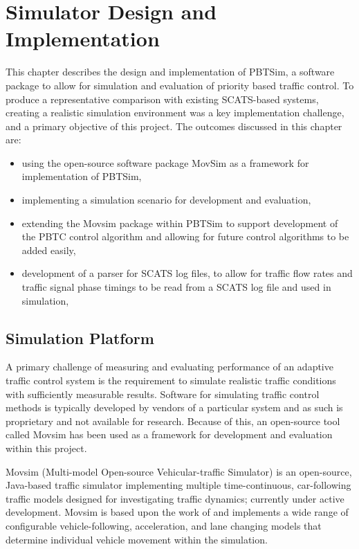 \chapter{Simulator Design and Implementation}

This chapter describes the design and implementation of PBTSim, a software package to allow for simulation and evaluation of priority based traffic control. To produce a representative comparison with existing SCATS-based systems, creating a realistic simulation environment was a key implementation challenge, and a primary objective of this project. The outcomes discussed in this chapter are:

\begin{itemize}
\item using the open-source software package MovSim as a framework for implementation of PBTSim,
\item implementing a simulation scenario for development and evaluation,
\item extending the Movsim package within PBTSim to support development of the PBTC control algorithm and allowing for future control algorithms to be added easily,
\item development of a parser for SCATS log files, to allow for traffic flow rates and traffic signal phase timings to be read from a SCATS log file and used in simulation,
\end{itemize}

\section{Simulation Platform}

A primary challenge of measuring and evaluating performance of an adaptive traffic control system is the requirement to simulate realistic traffic conditions with sufficiently measurable results. Software for simulating traffic control methods is typically developed by vendors of a particular system and as such is proprietary and not available for research. Because of this, an open-source tool called Movsim has been used as a framework for development and evaluation within this project. 

Movsim (Multi-model Open-source Vehicular-traffic Simulator) is an open-source, Java-based traffic simulator implementing multiple time-continuous, car-following traffic models designed for investigating traffic dynamics; currently under active development. Movsim is based upon the work of  and implements a wide range of configurable vehicle-following, acceleration, and lane changing models that determine individual vehicle movement within the simulation.

